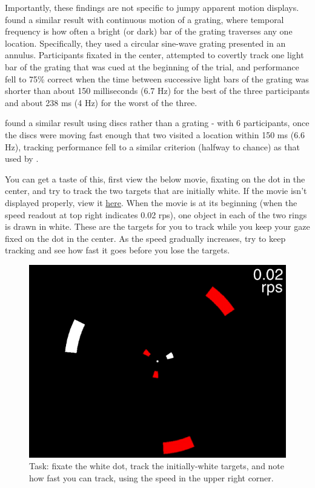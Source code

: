 \documentclass[
]{book}
\begin{document}
Importantly, these findings are not specific to jumpy apparent motion displays. \citet{verstratenLimitsAttentiveTracking2000} found a similar result with continuous motion of a grating, where temporal frequency is how often a bright (or dark) bar of the grating traverses any one location. Specifically, they used a circular sine-wave grating presented in an annulus. Participants fixated in the center, attempted to covertly track one light bar of the grating that was cued at the beginning of the trial, and performance fell to 75\% correct when the time between successive light bars of the grating was shorter than about 150 milliseconds (6.7 Hz) for the best of the three participants and about 238 ms (4 Hz) for the worst of the three.

\citet{holcombeSplittingAttentionReduces2013} found a similar result using discs rather than a grating - with 6 participants, once the discs were moving fast enough that two visited a location within 150 ms (6.6 Hz), tracking performance fell to a similar criterion (halfway to chance) as that used by \citet{verstratenLimitsAttentiveTracking2000}.

You can get a taste of this, first view the below movie, fixating on the dot in the center, and try to track the two targets that are initially white. If the movie isn't displayed properly, view it \href{movies/MOTmovies/temporalLimits/2targets3objectsPerArray.gif}{here}.
When the movie is at its beginning (when the speed readout at top right indicates 0.02 rps), one object in each of the two rings is drawn in white. These are the targets for you to track while you keep your gaze fixed on the dot in the center. As the speed gradually increases, try to keep tracking and see how fast it goes before you lose the targets.

\begin{figure}
\includegraphics[width=1\linewidth]{movies/MOTmovies/temporalLimits/static_2targets3objectsPerArray} \caption{Task: fixate the white dot, track the initially-white targets, and note how fast you can track, using the speed in the upper right corner.}\label{fig:unnamed-chunk-9}
\end{figure}
\end{document}

